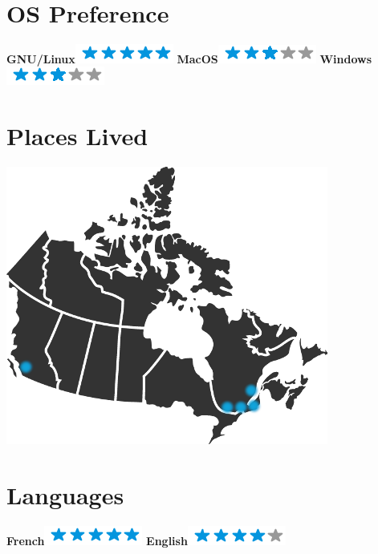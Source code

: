 \documentclass[]{friggeri-cv}
\begin{document}
\begin{aside}
~
~
~
  \section{OS Preference}
    \textbf{GNU/Linux}\includegraphics[scale=0.40]{img/5stars.png}
    \textbf{MacOS}\includegraphics[scale=0.40]{img/3stars.png}
    \textbf{Windows}\includegraphics[scale=0.40]{img/3stars.png}
    ~
  \section{Places Lived}
    \includegraphics[scale=0.25]{img/canada_lived.png}
    ~
  \section{Languages}
    \textbf{French}\includegraphics[scale=0.40]{img/5stars.png}
    \textbf{English}\includegraphics[scale=0.40]{img/4stars.png}
    ~
\end{aside}
\end{document}
